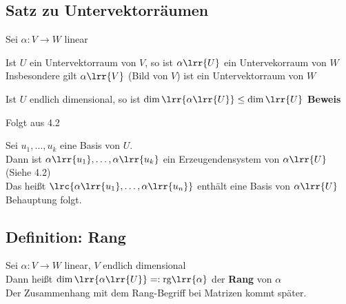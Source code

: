 \subsection{Satz zu Untervektorräumen}
	Sei $\alpha:V\rightarrow W$ linear
		\item Ist $U$ ein Untervektorraum von $V$, so ist $\alpha\lrr{U}$ ein Untervekorraum von $W$\\
			Insbesondere gilt $\alpha\lrr{V}$ (Bild von $V$) ist ein Untervektorraum von $W$
		\item Ist $U$ endlich dimensional, so ist $\dim\lrr{\alpha\lrr{U}}\leq\dim\lrr{U}$
	\subExEnd
	\textbf{Beweis}
		\item Folgt aus 4.2
		\item Sei $u_1,\dots,u_k$ eine Basis von $U$.\\
			Dann ist $\alpha\lrr{u_1},\dots,\alpha\lrr{u_k}$ ein Erzeugendensystem von $\alpha\lrr{U}$ (Siehe 4.2)\\
			Das heißt $\lrc{\alpha\lrr{u_1},\dots,\alpha\lrr{u_n}}$ enthält eine Basis von $\alpha\lrr{U}$ Behauptung folgt.
	\subExEnd

\subsection{Definition: Rang}
	Sei $\alpha:V\rightarrow W$ linear, $V$ endlich dimensional\\
	Dann heißt $\dim\lrr{\alpha\lrr{U}}=:\mbox{rg}\lrr{\alpha}$ der \textbf{Rang} von $\alpha$\\
	Der Zusammenhang mit dem Rang-Begriff bei Matrizen kommt später.

